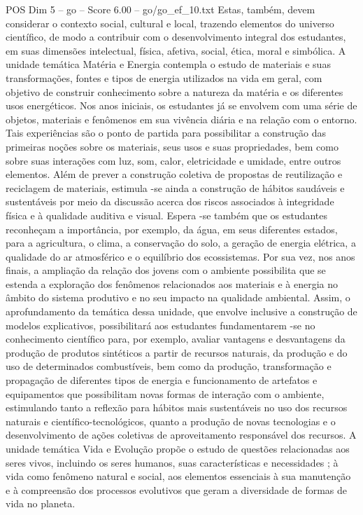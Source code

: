 \begin{textsample}{POS Dim 5 – go – Score 6.00 – go/go\_ef\_10.txt}
Estas, também, devem considerar o contexto social, cultural e local, trazendo elementos do universo científico, de modo a contribuir com o desenvolvimento integral dos estudantes, em suas dimensões intelectual, física, afetiva, social, ética, moral e simbólica.
A unidade temática Matéria e Energia contempla o estudo de materiais e suas transformações, fontes e tipos de energia utilizados na vida em geral, com objetivo de construir conhecimento sobre a natureza da matéria e os diferentes usos energéticos.
Nos anos iniciais, os estudantes já se envolvem com uma série de objetos, materiais e fenômenos em sua vivência diária e na relação com o entorno.
Tais experiências são o ponto de partida para possibilitar a construção das primeiras noções sobre os materiais, seus usos e suas propriedades, bem como sobre suas interações com luz, som, calor, eletricidade e umidade, entre outros elementos.
Além de prever a construção coletiva de propostas de reutilização e reciclagem de materiais, estimula -se ainda a construção de hábitos saudáveis e sustentáveis por meio da discussão acerca dos riscos associados à integridade física e à qualidade auditiva e visual.
Espera -se também que os estudantes reconheçam a importância, por exemplo, da água, em seus diferentes estados, para a agricultura, o clima, a conservação do solo, a geração de energia elétrica, a qualidade do ar atmosférico e o equilíbrio dos ecossistemas.
Por sua vez, nos anos finais, a ampliação da relação dos jovens com o ambiente possibilita que se estenda a exploração dos fenômenos relacionados aos materiais e à energia no âmbito do sistema produtivo e no seu impacto na qualidade ambiental.
Assim, o aprofundamento da temática dessa unidade, que envolve inclusive a construção de modelos explicativos, possibilitará aos estudantes fundamentarem -se no conhecimento científico para, por exemplo, avaliar vantagens e desvantagens da produção de produtos sintéticos a partir de recursos naturais, da produção e do uso de determinados combustíveis, bem como da produção, transformação e propagação de diferentes tipos de energia e funcionamento de artefatos e equipamentos que possibilitam novas formas de interação com o ambiente, estimulando tanto a reflexão para hábitos mais sustentáveis no uso dos recursos naturais e científico-tecnológicos, quanto a produção de novas tecnologias e o desenvolvimento de ações coletivas de aproveitamento responsável dos recursos.
A unidade temática Vida e Evolução propõe o estudo de questões relacionadas aos seres vivos, incluindo os seres humanos, suas características e necessidades ; à vida como fenômeno natural e social, aos elementos essenciais à sua manutenção e à compreensão dos processos evolutivos que geram a diversidade de formas de vida no planeta.

\end{textsample}
